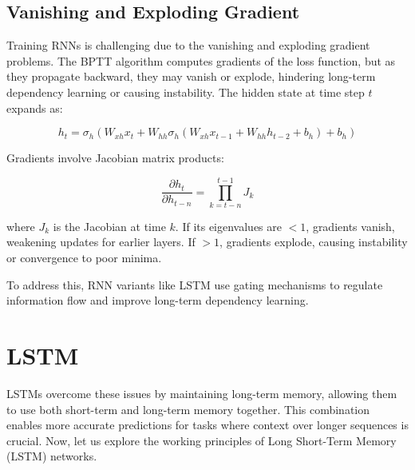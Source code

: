 \documentclass[11pt]{article}
\begin{document}
\subsection{Vanishing and Exploding Gradient}

Training RNNs is challenging due to the vanishing and exploding gradient problems. The BPTT algorithm computes gradients of the loss function, but as they propagate backward, they may vanish or explode, hindering long-term dependency learning or causing instability. The hidden state at time step \( t \) expands as:  

\begin{equation}
h_t = \sigma_h(W_{xh} x_t + W_{hh} \sigma_h(W_{xh} x_{t-1} + W_{hh} h_{t-2} + b_h) + b_h)
\end{equation}

Gradients involve Jacobian matrix products:  

\begin{equation}
\frac{\partial h_t}{\partial h_{t-n}} = \prod_{k=t-n}^{t-1} J_k
\end{equation}

where \( J_k \) is the Jacobian at time \( k \). If its eigenvalues are \( <1 \), gradients vanish, weakening updates for earlier layers. If \( >1 \), gradients explode, causing instability or convergence to poor minima.  

To address this, RNN variants like LSTM use gating mechanisms to regulate information flow and improve long-term dependency learning.
\section{LSTM}
LSTMs overcome these issues by maintaining long-term memory, allowing 
them to use both short-term and long-term memory together. This combination enables more accurate predictions 
for tasks where context over longer sequences is crucial. Now, let us explore the working principles of Long Short-Term Memory (LSTM) networks.
\end{document}
